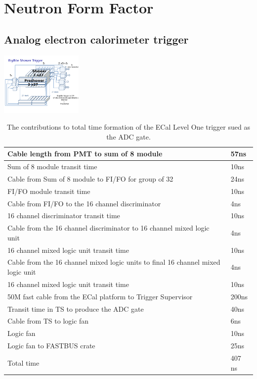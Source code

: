 \documentclass{article}
\begin{document}
\section {Neutron Form Factor}
\subsection {Analog electron calorimeter trigger}
\includegraphics[width=0.3\textwidth]{figs/BBETrig3D.pdf}

\begin{table}
 	\begin{tabular}{|l|l|} \hline
 		Cable length from PMT to sum of 8 module & 57ns \\ \hline
 		Sum of 8 module transit time & 10ns \\ \hline
 		Cable from Sum of 8 module to FI/FO for group of 32 & 24ns \\ \hline
 		FI/FO module transit time & 10ns \\ \hline
 		Cable from FI/FO to the 16 channel discriminator & 4ns \\ \hline
 		 16 channel discriminator  transit time & 10ns \\ \hline
 		 Cable from the 16 channel discriminator to 16 channel mixed logic unit& 4ns \\ \hline
  		 16 channel mixed logic unit  transit time & 10ns \\ \hline
  		 Cable from the 16 channel mixed logic units to final 16 channel mixed logic unit& 4ns \\ \hline
  		 16 channel mixed logic unit  transit time & 10ns \\ \hline
  		 50M fast cable from the ECal platform to Trigger Supervisor & 200ns \\ \hline
  		 Transit time in TS to produce the ADC gate & 40ns \\ \hline
  		 Cable from TS to logic fan  & 6ns \\ \hline\hline
                 Logic fan  & 10ns \\ \hline\hline
                 Logic fan to FASTBUS crate & 25ns \\ \hline\hline
  		 Total time & 407 ns \\ \hline  		   		  		 		 
 	\end{tabular}
 	\caption{The contributions to total time formation of the ECal Level One trigger sued as the ADC gate.}
 	\label{tab:ECALTrigtime}
 \end{table}
 
\end{document}
